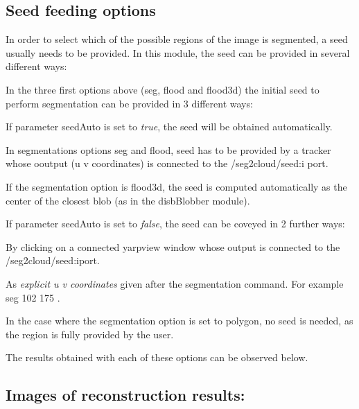 \subsection*{Seed feeding options}

In order to select which of the possible regions of the image is segmented, a seed usually needs to be provided. In this module, the seed can be provided in several different ways\+:
\begin{DoxyItemize}
\item In the three first options above ({\ttfamily seg}, {\ttfamily flood} and {\ttfamily flood3d}) the initial seed to perform segmentation can be provided in 3 different ways\+:
\item If parameter {\ttfamily seed\+Auto} is set to {\itshape true}, the seed will be obtained automatically.
\begin{DoxyItemize}
\item In segmentations options {\ttfamily seg} and {\ttfamily flood}, seed has to be provided by a tracker whose ooutput (u v coordinates) is connected to the {\ttfamily /seg2cloud/seed\+:i} port.
\item If the segmentation option is {\ttfamily flood3d}, the seed is computed automatically as the center of the closest blob (as in the disb\+Blobber module).
\end{DoxyItemize}
\item If parameter {\ttfamily seed\+Auto} is set to {\itshape false}, the seed can be coveyed in 2 further ways\+:
\begin{DoxyItemize}
\item By clicking on a connected yarpview window whose output is connected to the {\ttfamily /seg2cloud/seed\+:i}port.
\item As {\itshape explicit u v coordinates} given after the segmentation command. For example {\ttfamily  seg 102 175 }.
\end{DoxyItemize}
\item In the case where the segmentation option is set to {\ttfamily polygon}, no seed is needed, as the region is fully provided by the user.
\end{DoxyItemize}

The results obtained with each of these options can be observed below.

\subsection*{Images of reconstruction results\+:}

